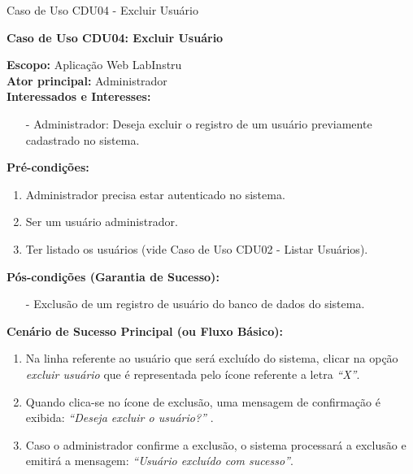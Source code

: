 \begin{quadro}[H]
\begin{framed}
\begin{flushleft}
		\end{flushleft}

	\end{framed}

\end {quadro} %

\begin{quadro}[H]
	\centering
	\caption{Caso de Uso CDU04 - Excluir Usuário}

	\begin{framed}

		\textbf{Caso de Uso CDU04: Excluir Usuário}\\

		\begin{flushleft}

		\textbf{Escopo:} Aplicação Web LabInstru\\

		\textbf{Ator principal:} Administrador\\

		\textbf{Interessados e Interesses:}
		\begin{itemize}
			\item[-] Administrador: Deseja excluir o registro de um usuário previamente cadastrado no sistema.
		\end{itemize}

		\textbf{Pré-condições:}\\
			 \begin{enumerate}
			 	\item{Administrador precisa estar autenticado no sistema.}
			 	\item{Ser um usuário administrador.}
			 	\item{Ter listado os usuários (vide Caso de Uso CDU02 - Listar Usuários).}
			 \end{enumerate}

		\textbf{Pós-condições (Garantia de Sucesso):}
		\begin{itemize}
			\item[-] Exclusão de um registro de usuário do banco de dados do sistema.
		\end{itemize}


		\textbf{Cenário de Sucesso Principal (ou Fluxo Básico):}\\
			\begin{enumerate}
				\item{Na linha referente ao usuário que será excluído do sistema, clicar na opção \textit{excluir usuário} que é representada pelo ícone referente a letra \textit{``X''}.}
				\item{Quando clica-se no ícone de exclusão, uma mensagem de confirmação é exibida: \textit{``Deseja excluir o usuário?''} . }
				\item{Caso o administrador confirme a exclusão, o sistema processará a exclusão e emitirá a mensagem: \textit{``Usuário excluído com sucesso''}.}
			 \end{enumerate}


\end{flushleft}
\end{framed}
\end{quadro}
